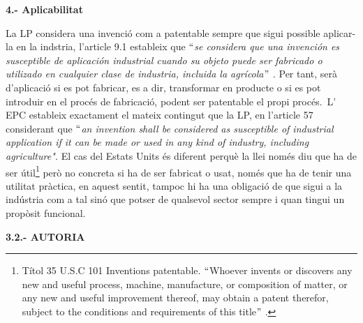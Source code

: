 \documentclass[12pt]{article}
\renewcommand{\_}{\kern-1.5pt\textunderscore\kern-1.5pt}
\begin{document}
\begin{itemize}
\vspace{\baselineskip}

\vspace{\baselineskip}

\vspace{\baselineskip}
\textbf{4.- Aplicabilitat}\par


\vspace{\baselineskip}
\begin{justify}
La LP considera una invenció com a patentable sempre que sigui possible aplicar-la en la indstria, l’article 9.1 estableix que $``$\textit{se considera que una invención es susceptible de aplicación industrial cuando su objeto puede ser fabricado o utilizado en cualquier clase de industria, incluida la agrícola$"$ .} Per tant, serà d’aplicació si es pot fabricar, es a dir, transformar en producte o si es pot introduir en el procés de fabricació, podent ser patentable el propi procés.\  L’ EPC estableix exactament el mateix contingut que la LP, en l’article 57 considerant que $``$\textit{an invention shall be considered as susceptible of industrial application if it can be made or used in any kind of industry, including agriculture". }El cas del Estats Units és diferent perquè la llei només diu que ha de ser útil\footnote{ Títol 35 U.S.C 101 Inventions patentable. $``$Whoever invents or discovers any new and useful process, machine, manufacture, or composition of matter, or any new and useful improvement thereof, may obtain a patent therefor, subject to the conditions and requirements of this title$"$ .  } però no concreta si ha de ser fabricat o usat, només que ha de tenir una utilitat pràctica, en aquest sentit, tampoc hi ha una obligació de que sigui a la indústria com a tal sinó que potser de qualsevol sector sempre i quan tingui un propòsit funcional. 
\end{justify}\par


\vspace{\baselineskip}
\begin{justify}
\textbf{3.2.- AUTORIA }
\end{justify}\par



\end{itemize}
\end{document}
